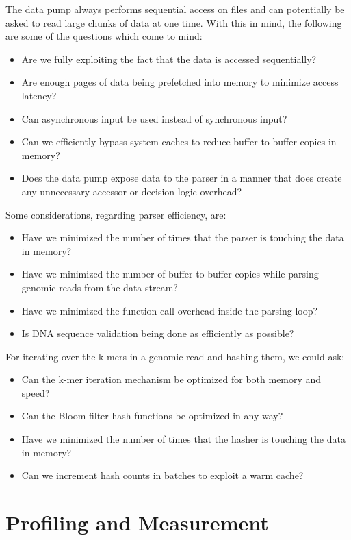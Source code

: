 \documentclass{article}
\begin{document}
The data pump always performs sequential access on files and can potentially be asked to read large chunks of data at one time. With this in mind, the following are some of the questions which come to mind:
\begin{itemize}
\item Are we fully exploiting the fact that the data is accessed sequentially?
\item Are enough pages of data being prefetched into memory to minimize access latency?
\item Can asynchronous input be used instead of synchronous input?
\item Can we efficiently bypass system caches to reduce buffer-to-buffer copies in memory?
\item Does the data pump expose data to the parser in a manner that does create any unnecessary accessor or decision logic overhead?
\end{itemize}

Some considerations, regarding parser efficiency, are:
\begin{itemize}
\item Have we minimized the number of times that the parser is touching the data in memory?
\item Have we minimized the number of buffer-to-buffer copies while parsing genomic reads from the data stream?
\item Have we minimized the function call overhead inside the parsing loop?
\item Is DNA sequence validation being done as efficiently as possible?
\end{itemize}

For iterating over the k-mers in a genomic read and hashing them, we could ask:
\begin{itemize}
\item Can the k-mer iteration mechanism be optimized for both memory and speed?
\item Can the Bloom filter hash functions be optimized in any way?
\item Have we minimized the number of times that the hasher is touching the data in memory?
\item Can we increment hash counts in batches to exploit a warm cache?
\end{itemize}

\section{Profiling and Measurement}
\end{document}
